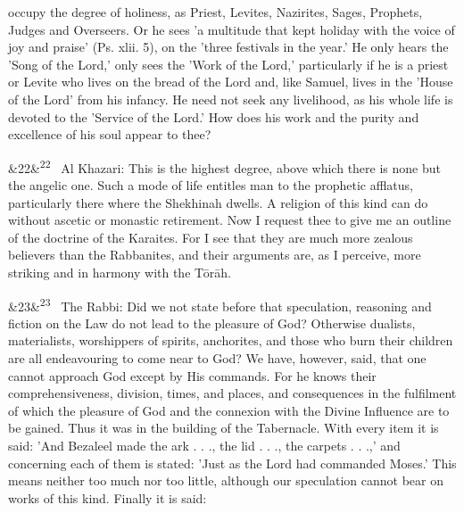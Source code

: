 \documentclass[12pt]{article}
\newcommand{\para}[1][]{\par\noindent\ifx&#1&\else\textsuperscript{\footnotesize #1}~\fi}
\begin{document}
occupy the degree of holiness, as Priest, Levites, Nazirites, Sages, Prophets, Judges and Overseers. Or he sees 'a multitude that kept holiday with the voice of joy and praise' (Ps. xlii. 5), on the 'three festivals in the year.' He only hears the 'Song of the Lord,' only sees the 'Work of the Lord,' particularly if he is a priest or Levite who lives on the bread of the Lord and, like Samuel, lives in the 'House of the Lord' from his infancy. He need not seek any livelihood, as his whole life is devoted to the 'Service of the Lord.' How does his work and the purity and excellence of his soul appear to thee?

\para[22] Al Khazari: This is the highest degree, above which there is none but the angelic one. Such a mode of life entitles man to the prophetic afflatus, particularly there where the Shekhinah dwells. A religion of this kind can do without ascetic or monastic retirement. Now I request thee to give me an outline of the doctrine of the Karaites. For I see that they are much more zealous believers than the Rabbanites, and their arguments are, as I perceive, more striking and in harmony with the Tōrāh.

\para[23] The Rabbi: Did we not state before that speculation, reasoning and fiction on the Law do not lead to the pleasure of God? Otherwise dualists, materialists, worshippers of spirits, anchorites, and those who burn their children are all endeavouring to come near to God? We have, however, said, that one cannot approach God except by His commands. For he knows their comprehensiveness, division, times, and places, and consequences in the fulfilment of which the pleasure of God and the connexion with the Divine Influence are to be gained. Thus it was in the building of the Tabernacle. With every item it is said: 'And Bezaleel made the ark . . ., the lid . . ., the carpets . . .,' and concerning each of them is stated: 'Just as the Lord had commanded Moses.' This means neither too much nor too little, although our speculation cannot bear on works of this kind. Finally it is said:
\end{document}
